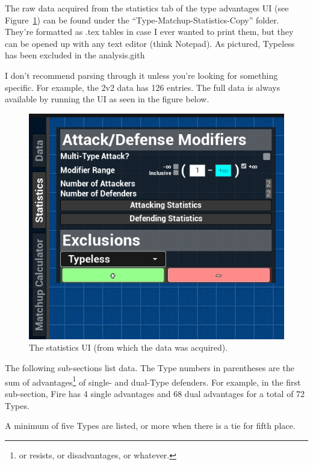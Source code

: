 \newpage

The raw data acquired from the statistics tab of the type advantages UI (see Figure~\ref{fig:stats-ui}) can be found under the ``Type-Matchup-Statistics-Copy'' folder. They're formatted as .tex tables in case I ever wanted to print them, but they can be opened up with any text editor (think Notepad). As pictured, Typeless has been excluded in the analysis.gith

I don't recommend parsing through it unless you're looking for something specific. For example, the 2v2 data has 126 entries. The full data is always available by running the UI as seen in the figure below.

\begin{figure}[H]
	\begin{center}
		\includegraphics[scale=2]{statistics-ui}
		\caption{The statistics UI (from which the data was acquired).}
		\label{fig:stats-ui}
	\end{center}
\end{figure}

The following sub-sections list data. The Type numbers in parentheses are the sum of advantages\footnote{or resists, or disadvantages, or whatever.} of single- and dual-Type defenders. For example, in the first sub-section, Fire has 4 single advantages and 68 dual advantages for a total of 72 Types.

A minimum of five Types are listed, or more when there is a tie for fifth place.


